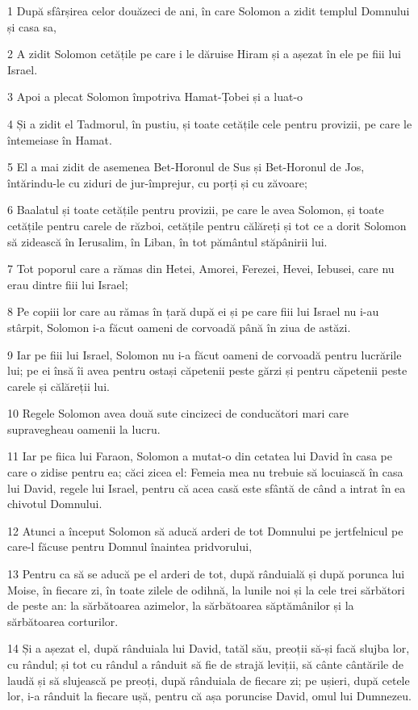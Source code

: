 \par 1 După sfârșirea celor douăzeci de ani, în care Solomon a zidit templul Domnului și casa sa,
\par 2 A zidit Solomon cetățile pe care i le dăruise Hiram și a așezat în ele pe fiii lui Israel.
\par 3 Apoi a plecat Solomon împotriva Hamat-Țobei și a luat-o
\par 4 Și a zidit el Tadmorul, în pustiu, și toate cetățile cele pentru provizii, pe care le întemeiase în Hamat.
\par 5 El a mai zidit de asemenea Bet-Horonul de Sus și Bet-Horonul de Jos, întărindu-le cu ziduri de jur-împrejur, cu porți și cu zăvoare;
\par 6 Baalatul și toate cetățile pentru provizii, pe care le avea Solomon, și toate cetățile pentru carele de război, cetățile pentru călăreți și tot ce a dorit Solomon să zidească în Ierusalim, în Liban, în tot pământul stăpânirii lui.
\par 7 Tot poporul care a rămas din Hetei, Amorei, Ferezei, Hevei, Iebusei, care nu erau dintre fiii lui Israel;
\par 8 Pe copiii lor care au rămas în țară după ei și pe care fiii lui Israel nu i-au stârpit, Solomon i-a făcut oameni de corvoadă până în ziua de astăzi.
\par 9 Iar pe fiii lui Israel, Solomon nu i-a făcut oameni de corvoadă pentru lucrările lui; pe ei însă îi avea pentru ostași căpetenii peste gărzi și pentru căpetenii peste carele și călăreții lui.
\par 10 Regele Solomon avea două sute cincizeci de conducători mari care supravegheau oamenii la lucru.
\par 11 Iar pe fiica lui Faraon, Solomon a mutat-o din cetatea lui David în casa pe care o zidise pentru ea; căci zicea el: Femeia mea nu trebuie să locuiască în casa lui David, regele lui Israel, pentru că acea casă este sfântă de când a intrat în ea chivotul Domnului.
\par 12 Atunci a început Solomon să aducă arderi de tot Domnului pe jertfelnicul pe care-l făcuse pentru Domnul înaintea pridvorului,
\par 13 Pentru ca să se aducă pe el arderi de tot, după rânduială și după porunca lui Moise, în fiecare zi, în toate zilele de odihnă, la lunile noi și la cele trei sărbători de peste an: la sărbătoarea azimelor, la sărbătoarea săptămânilor și la sărbătoarea corturilor.
\par 14 Și a așezat el, după rânduiala lui David, tatăl său, preoții să-și facă slujba lor, cu rândul; și tot cu rândul a rânduit să fie de strajă leviții, să cânte cântările de laudă și să slujească pe preoți, după rânduiala de fiecare zi; pe ușieri, după cetele lor, i-a rânduit la fiecare ușă, pentru că așa poruncise David, omul lui Dumnezeu.
